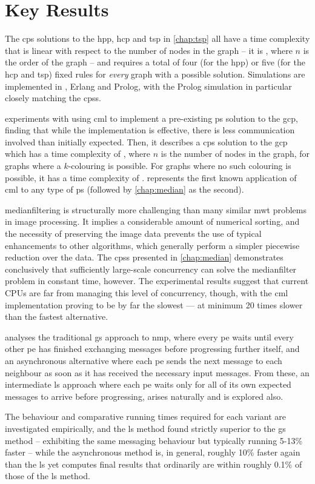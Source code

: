 \section{Key Results}

The \gls{cps} solutions to the \gls{hpp}, \gls{hcp} and \gls{tsp} in \cref{chap:tsp} all have a time complexity that is linear with respect to the number of nodes in the graph -- \ie{} it is , where \(n\) is the order of the graph -- and requires a total of four (for the \gls{hpp}) or five (for the \gls{hcp} and \gls{tsp}) fixed rules for \emph{every} graph with a possible solution.  Simulations are implemented in \fsharp{}, Erlang and Prolog, with the Prolog simulation in particular closely matching the \glspl{cps}.

 experiments with using \gls{cml} to implement a pre-existing \gls{ps} solution to the \gls{gcp}, finding that while the implementation is effective, there is less communication involved than initially expected.  Then, it describes a \gls{cps} solution to the \gls{gcp} which has a time complexity of , where \(n\) is the number of nodes in the graph, for graphs where a \(k\)-colouring is possible.  For graphs where no such colouring is possible, it has a time complexity of .   represents the first known application of \gls{cml} to any type of \gls{ps} (followed by \cref{chap:median} as the second).

\Gls{medianfilter}ing is structurally more challenging than many similar \gls{mwt} problems in image processing.  It implies a considerable amount of numerical sorting, and the necessity of preserving the image data prevents the use of typical enhancements to other algorithms, which generally perform a simpler piecewise reduction over the data.  The \glspl{cps} presented in \cref{chap:median} demonstrates conclusively that sufficiently large-scale concurrency can solve the \gls{medianfilter} problem in constant time, however.  The experimental results suggest that current CPUs are far from managing this level of concurrency, though, with the \gls{cml} implementation proving to be by far the slowest --- at minimum 20 times slower than the fastest alternative.

 analyses the traditional \gls{gs} approach to \gls{nmp}, where every \gls{pe} waits until every other \gls{pe} has finished exchanging messages before progressing further itself, and an asynchronous alternative where each \gls{pe} sends the next message to each neighbour as soon as it has received the necessary input messages.  From these, an intermediate \gls{ls} approach where each \gls{pe} waits only for all of its own expected messages to arrive before progressing, arises naturally and is explored also.

The behaviour and comparative running times required for each variant are investigated empirically, and the \gls{ls} method found strictly superior to the \gls{gs} method -- exhibiting the same messaging behaviour but typically running 5-13\% faster -- while the asynchronous method is, in general, roughly 10\% faster again than the \gls{ls} yet computes final results that ordinarily are within roughly 0.1\% of those of the \gls{ls} method.